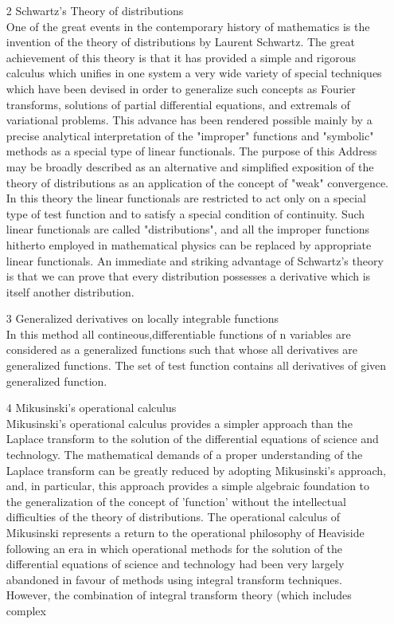 \begin{large}
\begin{itemize}
\item[2] Schwartz's Theory of distributions\\
One of the great events in the contemporary history of mathematics is the invention of the theory of distributions by Laurent Schwartz. The great achievement of this theory is that it has provided a simple and rigorous calculus which unifies in one system a very wide variety of special techniques which have been devised in order to generalize such concepts
as Fourier transforms, solutions of partial differential equations, and extremals of variational problems. This advance has been rendered
possible mainly by a precise analytical interpretation of the "improper" functions and "symbolic" methods as a special type of linear functionals. The purpose of this Address may be broadly described as an alternative and simplified exposition of the theory of distributions as an application of the concept of "weak" convergence.\\
In this theory the linear functionals are restricted to act only on a special type of test function and to satisfy a special condition of continuity. Such linear functionals are called "distributions", and all the improper functions hitherto employed in mathematical physics can be replaced by appropriate linear functionals. An immediate and striking advantage of Schwartz's theory is that we can prove that every distribution possesses a derivative which is itself
another distribution.
\item[3] Generalized derivatives on locally integrable functions\\
In this method all contineous,differentiable  functions of n variables are considered as a generalized functions such that whose all derivatives are generalized functions. The set of test function contains all derivatives of given generalized function.
\item[4] Mikusinski's operational calculus\\
Mikusinski's operational calculus provides a simpler approach than the Laplace transform to the solution of the differential equations of science and technology. The mathematical demands of a proper understanding of the Laplace transform can be greatly reduced by
adopting Mikusinski's approach, and, in particular, this approach provides a simple algebraic foundation to the generalization of the concept of 'function' without the intellectual difficulties of the theory of distributions. The operational calculus of Mikusinski represents a return to the operational philosophy of Heaviside following an era in which operational methods for the solution of the differential equations of science and technology had been very largely abandoned in favour of methods using integral transform techniques. However, the combination of integral transform theory (which includes complex

\end{itemize}
\end{large}

